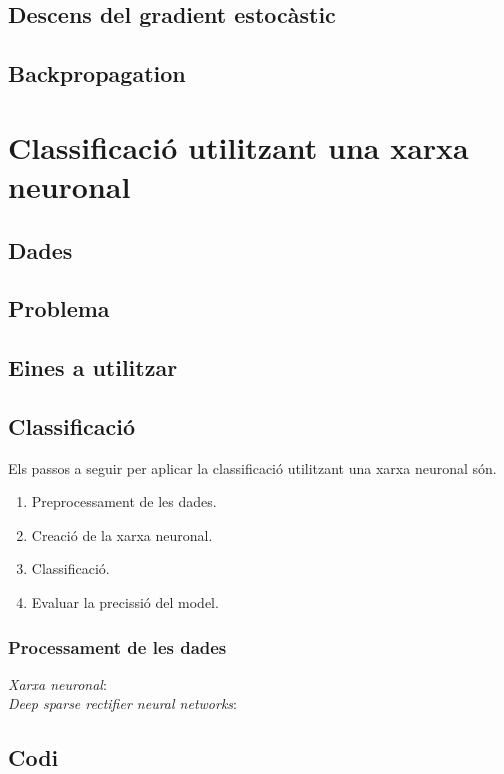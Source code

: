 \documentclass[12pt]{article}
\begin{document}
\clearpage
\subsection{Descens del gradient estocàstic\label{dge}}


\clearpage
\subsection{Backpropagation\label{bp}}


\clearpage
\section{Classificació utilitzant una xarxa neuronal}
\subsection{Dades}
\subsection{Problema}
\subsection{Eines a utilitzar}
\subsection{Classificació}
Els passos a seguir per aplicar la classificació utilitzant una xarxa neuronal són.
\begin{enumerate}
	\item Preprocessament de les dades.
	\item Creació de la xarxa neuronal.
	\item Classificació.
	\item Evaluar la precissió del model.
\end{enumerate}
\subsubsection{Processament de les dades}

\clearpage
\begin{thebibliography}{9}
	\textit{Xarxa neuronal}:
  	\\
	\textit{Deep sparse rectifier neural networks}:
  	\\
\end{thebibliography}

\clearpage
\begin{appendices}
\section{Codi}
\end{appendices}
\end{document}
